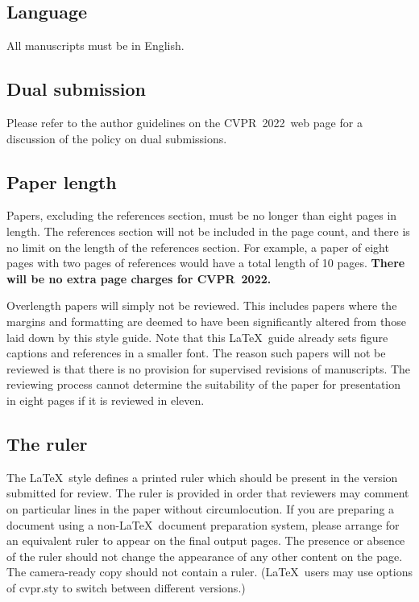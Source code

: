 \documentclass[10pt,twocolumn,letterpaper]{article}
\def\confName{CVPR}
\def\confYear{2022}
\begin{document}
\subsection{Language}

All manuscripts must be in English.

\subsection{Dual submission}

Please refer to the author guidelines on the \confName\ \confYear\ web page for a
discussion of the policy on dual submissions.

\subsection{Paper length}
Papers, excluding the references section, must be no longer than eight pages in length.
The references section will not be included in the page count, and there is no limit on the length of the references section.
For example, a paper of eight pages with two pages of references would have a total length of 10 pages.
{\bf There will be no extra page charges for \confName\ \confYear.}

Overlength papers will simply not be reviewed.
This includes papers where the margins and formatting are deemed to have been significantly altered from those laid down by this style guide.
Note that this \LaTeX\ guide already sets figure captions and references in a smaller font.
The reason such papers will not be reviewed is that there is no provision for supervised revisions of manuscripts.
The reviewing process cannot determine the suitability of the paper for presentation in eight pages if it is reviewed in eleven.

\subsection{The ruler}
The \LaTeX\ style defines a printed ruler which should be present in the version submitted for review.
The ruler is provided in order that reviewers may comment on particular lines in the paper without circumlocution.
If you are preparing a document using a non-\LaTeX\ document preparation system, please arrange for an equivalent ruler to appear on the final output pages.
The presence or absence of the ruler should not change the appearance of any other content on the page.
The camera-ready copy should not contain a ruler.
(\LaTeX\ users may use options of cvpr.sty to switch between different versions.)
\end{document}
